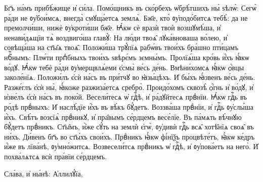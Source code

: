 \cuLettrine
Бг҃ъ на́мъ прибѣ́жище и҆ си́ла. 
\hKv Помо́щникъ въ  ско́рбехъ ѡ҆брѣ́тшихъ ны̀ ѕѣлѡ̀: 
\hKv Сегѡ̀ ра́ди не  ᲂу҆бои́мсѧ, внегда̀ смꙋща́етсѧ землѧ̀. 
\hKv Бж҃е, кто̀  ᲂу҆подо́битсѧ тебѣ̀: да не премолчи́ши, нижѐ ᲂу҆кроти́ши  бж҃е. 
\hKv Ꙗ҆́кѡ сѐ вразѝ твоѝ возшꙋмѣ́ша, и҆  ненави́дѧщїи тѧ̀ воздвиго́ша главꙋ̀: 
\hKv На лю́ди твоѧ̑  лꙋка́вноваша во́лею, и҆ совѣща́ша на ст҃ы̑ѧ твоѧ̑. 
\hKv  Положи́ша трꙋ́пїѧ рабѡ́въ твои́хъ бра́шно пти́цамъ нбⷭ҇нымъ:  
\hKv Плѡ́ти прпⷣбныхъ твои́хъ ѕвѣрє́мъ зємны́мъ. 
\hKv  Пролїѧ́ша кро́вь и҆́хъ ꙗ҆́кѡ во́дꙋ. 
\hKv Ꙗ҆́кѡ тебѐ ра́ди  ᲂу҆мерщвлѧ́еми є҆смы̀ ве́сь де́нь. 
\hKv Вмѣни́хомсѧ  ꙗ҆́кѡ ѻ҆́вцы заколе́нїѧ. 
\hKv Положи́лъ є҆сѝ на́съ въ  при́тчꙋ во ꙗ҆зы́цѣхъ. 
\hKv И҆ бы́хъ ꙗ҆́звенъ ве́сь де́нь.  
\hKv Разже́глъ є҆сѝ ны̀, ꙗ҆́коже разжиза́етсѧ сребро̀.  
\hKv Проидо́хомъ сквозѣ̀ ѻ҆́гнь и҆ во́дꙋ, и҆ и҆зве́лъ  є҆сѝ на́съ въ поко́й. 
\hKv Весели́тесѧ ѡ҆ гдⷭ҇ѣ, и҆  ра́дꙋйтесѧ првⷣнїи. 
\hKv Ꙗ҆́кѡ гдⷭ҇ь въ ро́дѣ првⷣныхъ:   
\hKv И҆ наслѣ́дїе и҆́хъ въ  вѣ́къ бꙋ́детъ. 
\hKv Воззва́ша првⷣнїи, и҆ гдⷭ҇ь ᲂу҆слы́ша  и҆̀хъ. 
\hKv Свѣ́тъ возсїѧ̀ првⷣникꙋ, и҆ пра̑вымъ се́рдцемъ  весе́лїе. 
\hKv Въ па́мѧть вѣ́чнꙋю бꙋ́детъ првⷣникъ. 
\hKv  Ст҃ы̑мъ, и҆̀же сꙋ́ть на землѝ є҆гѡ̀, ᲂу҆дивѝ гдⷭ҇ь всѧ̑  хотѣ̑нїѧ своѧ̑ въ ни́хъ. 
\hKv Ди́венъ бг҃ъ во ст҃ы́хъ  свои́хъ. 
\hKv Првⷣникъ ꙗ҆́кѡ фі́нїѯъ процвѣте́тъ,  ꙗ҆́кѡ ке́дръ и҆́же въ лїва́нѣ, ᲂу҆мно́житсѧ. 
\hKv  Возвесели́тсѧ првⷣникъ ѡ҆ гдⷭ҇ѣ, и҆ ᲂу҆пова́етъ на него̀.  
\hKv И҆ похва́лѧтсѧ всѝ пра́вїи се́рдцемъ. 

\hKv Сла́ва, и҆ ны́нѣ: А҆ллилꙋ́їа,  





